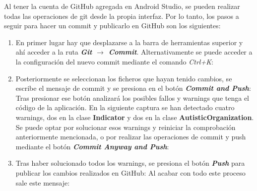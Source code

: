     Al tener la cuenta de GitHub agregada en Android Studio, se pueden realizar todas las operaciones de git desde la propia interfaz. Por lo tanto, los pasos a seguir para hacer un commit y publicarlo en GitHub son los siguientes:
    \begin{enumerate}
        \item En primer lugar hay que desplazarse a la barra de herramientas superior y ahí acceder a la ruta \textit{\textbf{Git $\rightarrow$ Commit}}. Alternativamente se puede acceder a la configuración del nuevo commit mediante el comando \textit{Ctrl+K}:
        \item Posteriormente se seleccionan los ficheros que hayan tenido cambios, se escribe el mensaje de commit y se presiona en el botón \textit{\textbf{Commit and Push}}:
        Tras presionar ese botón analizará los posibles fallos y warnings que tenga el código de la aplicación. En la siguiente captura se han detectado cuatro warnings, dos en la clase \textbf{Indicator} y dos en la clase \textbf{AutisticOrganization}. Se puede optar por solucionar esos warnings y reiniciar la comprobación anteriormente mencionada, o por realizar las operaciones de commit y push mediante el botón \textit{\textbf{Commit Anyway and Push}}:
        \item Tras haber solucionado todos los warnings, se presiona el botón \textit{\textbf{Push}} para publicar los cambios realizados en GitHub:
        Al acabar con todo este proceso sale este mensaje:
    \end{enumerate}


